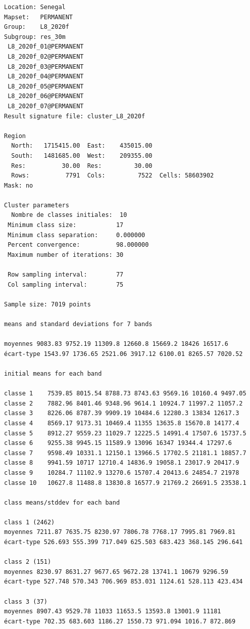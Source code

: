 \documentclass[earth,article,accept,pdftex,moreauthors]{Definitions/mdpi}
\begin{document}
{\begin{scriptsize}
\begin{verbatim}
Location: Senegal
Mapset:   PERMANENT
Group:    L8_2020f
Subgroup: res_30m
 L8_2020f_01@PERMANENT
 L8_2020f_02@PERMANENT
 L8_2020f_03@PERMANENT
 L8_2020f_04@PERMANENT
 L8_2020f_05@PERMANENT
 L8_2020f_06@PERMANENT
 L8_2020f_07@PERMANENT
Result signature file: cluster_L8_2020f

Region
  North:   1715415.00  East:    435015.00
  South:   1481685.00  West:    209355.00
  Res:          30.00  Res:         30.00
  Rows:          7791  Cols:         7522  Cells: 58603902
Mask: no

Cluster parameters
  Nombre de classes initiales: 	10
 Minimum class size:           17
 Minimum class separation:     0.000000
 Percent convergence:          98.000000
 Maximum number of iterations: 30

 Row sampling interval:        77
 Col sampling interval:        75

Sample size: 7019 points

means and standard deviations for 7 bands

moyennes 9083.83 9752.19 11309.8 12660.8 15669.2 18426 16517.6
écart-type 1543.97 1736.65 2521.06 3917.12 6100.01 8265.57 7020.52

initial means for each band

classe 1    7539.85 8015.54 8788.73 8743.63 9569.16 10160.4 9497.05
classe 2    7882.96 8401.46 9348.96 9614.1 10924.7 11997.2 11057.2
classe 3    8226.06 8787.39 9909.19 10484.6 12280.3 13834 12617.3
classe 4    8569.17 9173.31 10469.4 11355 13635.8 15670.8 14177.4
classe 5    8912.27 9559.23 11029.7 12225.5 14991.4 17507.6 15737.5
classe 6    9255.38 9945.15 11589.9 13096 16347 19344.4 17297.6
classe 7    9598.49 10331.1 12150.1 13966.5 17702.5 21181.1 18857.7
classe 8    9941.59 10717 12710.4 14836.9 19058.1 23017.9 20417.9
classe 9    10284.7 11102.9 13270.6 15707.4 20413.6 24854.7 21978
classe 10   10627.8 11488.8 13830.8 16577.9 21769.2 26691.5 23538.1

class means/stddev for each band

class 1 (2462)
moyennes 7211.87 7635.75 8230.97 7806.78 7768.17 7995.81 7969.81
écart-type 526.693 555.399 717.049 625.503 683.423 368.145 296.641

class 2 (151)
moyennes 8230.97 8631.27 9677.65 9672.28 13741.1 10679 9296.59
écart-type 527.748 570.343 706.969 853.031 1124.61 528.113 423.434

class 3 (37)
moyennes 8907.43 9529.78 11033 11653.5 13593.8 13001.9 11181
écart-type 702.35 683.603 1186.27 1550.73 971.094 1016.7 872.869


\end{verbatim}
\end{scriptsize}}
\end{document}
